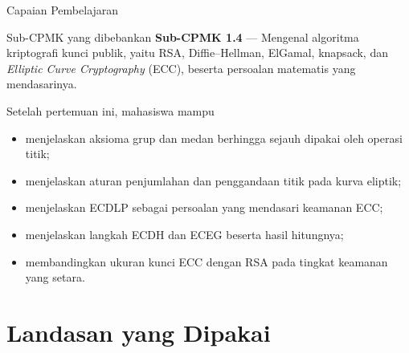 \documentclass[aspectratio=169,11pt]{beamer}
\begin{document}
\begin{frame}{Capaian Pembelajaran}
    \begin{block}{Sub-CPMK yang dibebankan}
        \footnotesize
        \textbf{Sub-CPMK 1.4} --- Mengenal algoritma kriptografi kunci
        publik, yaitu RSA, Diffie--Hellman, ElGamal, knapsack, dan
        \textit{Elliptic Curve Cryptography} (ECC), beserta persoalan
        matematis yang mendasarinya.
    \end{block}
    \vspace{0.15cm}
    \begin{exampleblock}{Setelah pertemuan ini, mahasiswa mampu}
        \footnotesize
        \begin{itemize}
            \item menjelaskan aksioma grup dan medan berhingga sejauh dipakai
                  oleh operasi titik;
            \item menjelaskan aturan penjumlahan dan penggandaan titik pada
                  kurva eliptik;
            \item menjelaskan ECDLP sebagai persoalan yang mendasari keamanan
                  ECC;
            \item menjelaskan langkah ECDH dan ECEG beserta hasil hitungnya;
            \item membandingkan ukuran kunci ECC dengan RSA pada tingkat
                  keamanan yang setara.
        \end{itemize}
    \end{exampleblock}
\end{frame}

\section{Landasan yang Dipakai}
\end{document}
